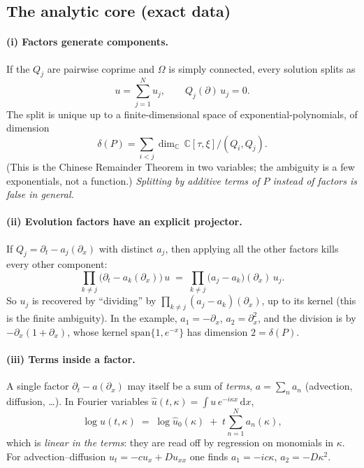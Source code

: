\documentclass[11pt,a4paper]{article}
\newcommand{\dd}{\,\mathrm d}
\begin{document}
\subsection{The analytic core (exact data)}\label{sec:core}

\paragraph{(i) Factors generate components.}
If the $Q_j$ are pairwise coprime and $\Omega$ is simply connected, every solution splits as
\[
u=\sum_{j=1}^{N}u_j,\qquad Q_j(\partial)\,u_j=0 .
\]
The split is unique up to a finite-dimensional space of exponential-polynomials, of dimension
\[
\delta(P)=\sum_{i<j}\dim_{\mathbb C}\,\mathbb C[\tau,\xi]\big/(Q_i,Q_j).
\]
(This is the Chinese Remainder Theorem in two variables; the ambiguity is a few exponentials, not a function.) \emph{Splitting by additive terms of $P$ instead of factors is false in general.}

\paragraph{(ii) Evolution factors have an explicit projector.}
If $Q_j=\partial_t-a_j(\partial_x)$ with distinct $a_j$, then applying all the other factors kills every other component:
\[
\prod_{k\ne j}\big(\partial_t-a_k(\partial_x)\big)\,u\;=\;\prod_{k\ne j}\big(a_j-a_k\big)(\partial_x)\,u_j .
\]
So $u_j$ is recovered by ``dividing'' by $\prod_{k\ne j}(a_j-a_k)(\partial_x)$, up to its kernel (this is the finite ambiguity). In the example, $a_1=-\partial_x$, $a_2=\partial_x^2$, and the division is by $-\partial_x(1+\partial_x)$, whose kernel $\mathrm{span}\{1,e^{-x}\}$ has dimension $2=\delta(P)$.

\paragraph{(iii) Terms inside a factor.}
A single factor $\partial_t-a(\partial_x)$ may itself be a sum of \emph{terms}, $a=\sum_n a_n$ (advection, diffusion, \dots). In Fourier variables $\hat u(t,\kappa)=\int u\,e^{-i\kappa x}\dd x$,
\[
\log\hat u(t,\kappa)\;=\;\log\hat u_0(\kappa)\;+\;t\sum_{n=1}^{N} a_n(\kappa),
\]
which is \emph{linear in the terms}: they are read off by regression on monomials in $\kappa$. For advection--diffusion $u_t=-cu_x+Du_{xx}$ one finds $a_1=-ic\kappa$, $a_2=-D\kappa^2$.
\end{document}
